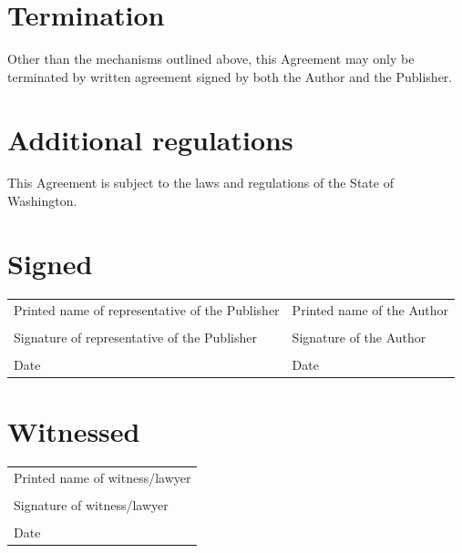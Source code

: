 \documentclass[12pt,letterpaper,oneside]{article}
\begin{document}
\section{Termination}

Other than the mechanisms outlined above, this Agreement may only be terminated by written agreement signed by both the Author and the Publisher.

\section{Additional regulations}

This Agreement is subject to the laws and regulations of the State of Washington.

\newpage

\thispagestyle{final}

\section*{Signed}

\begin{tabular}{p{3in} | p{3in}}
    \vspace{0.5in} & \\ \hline
    Printed name of representative of the Publisher & Printed name of the Author \\
    \vspace{0.5in} & \\ \hline
    Signature of representative of the Publisher & Signature of the Author \\
    \vspace{0.5in} & \\ \hline
    Date & Date \\
\end{tabular}

\section*{Witnessed}

\begin{tabular}{l}
    \vspace{0.5in} \\ \hline
    Printed name of witness/lawyer \\
    \vspace{0.5in} \\ \hline
    Signature of witness/lawyer \\
    \vspace{0.5in} \\ \hline
    Date \\
\end{tabular}
\end{document}
